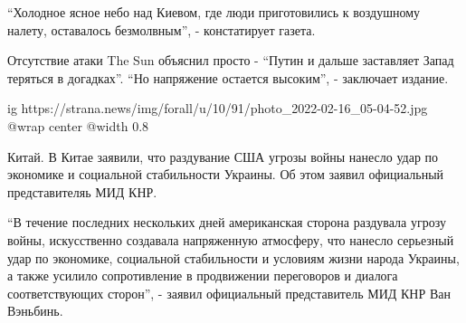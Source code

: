 \enquote{Холодное ясное небо над Киевом, где люди приготовились к воздушному налету,
оставалось безмолвным}, - констатирует газета.

Отсутствие атаки The Sun объяснил просто - \enquote{Путин и дальше заставляет Запад
теряться в догадках}. \enquote{Но напряжение остается высоким}, - заключает издание.

\ifcmt
  ig https://strana.news/img/forall/u/10/91/photo_2022-02-16_05-04-52.jpg
  @wrap center
  @width 0.8
\fi

Китай. В Китае заявили, что раздувание США угрозы войны нанесло удар по
экономике и социальной стабильности Украины. Об этом заявил официальный
представителяь МИД КНР.

\enquote{В течение последних нескольких дней американская сторона раздувала угрозу
войны, искусственно создавала напряженную атмосферу, что нанесло серьезный удар
по экономике, социальной стабильности и условиям жизни народа Украины, а также
усилило сопротивление в продвижении переговоров и диалога соответствующих
сторон}, - заявил официальный представитель МИД КНР Ван Вэньбинь.

